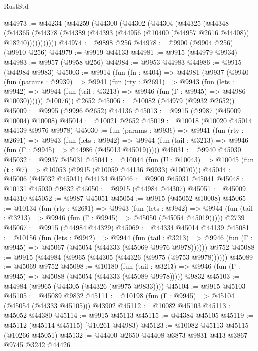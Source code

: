 \begin{lexlean}{RustStd}
\begin{coremodule}
@44973 := @44234
    (@44259
      (@44300
        (@44302
          (@44304
            (@44325
              (@44348
                (@44365
                  (@44378 (@44389 (@44393 (@44956 (@10400 (@44957 @2616 @44408)) @18240)))))))))))
@44974 := @9898 @256
@44978 := @9900 (@9904 @256) (@9910 @256)
@44979 := @9919 @44133
@44981 := @9915 (@44979 @9934)
@44983 := @9957 (@9958 @256)
@44984 := @9953 @44983
@44986 := @9915 (@44984 @9983)
@45003 := @9914
    (fun (fn : @404) =>
    @44981
      (@9937
        (@9940
          (fun (params : @9939) =>
          @9941
            (fun (rty : @2691) =>
            @9943
              (fun (lets : @9942) =>
              @9944 (fun (tail : @3213) => @9946 (fun (Γ : @9945) => @44986 @10030))))))
        @10076))
    @2652
@45006 := @10082 (@44979 (@9932 @2652))
@45009 := @9995 (@9996 @2652) @44136
@45013 := @9915 (@9987 (@45009 @10004) @10008)
@45014 := @10021 @2652
@45019 := @10018 (@10020 @45014 @44139 @9976 @9978)
@45030 := fun (params : @9939) =>
  @9941
    (fun (rty : @2691) =>
    @9943
      (fun (lets : @9942) =>
      @9944 (fun (tail : @3213) => @9946 (fun (Γ : @9945) => @44986 (@45013 @45019)))))
@45031 := @9940 @45030
@45032 := @9937 @45031
@45041 := @10044
    (fun (U : @10043) => @10045 (fun (t : @7) => @10053 (@9915 (@10059 @44136 @9933) @10070)))
@45044 := @45006 (@45032 @45041) @44134
@45046 := @9900 @45031 @45041
@45048 := @10131 @45030 @9632
@45050 := @9915 (@44984 @44307)
@45051 := @45009 @44310
@45052 := @9987 @45051
@45054 := @9915 (@45052 @10008)
@45065 := @10134
    (fun (rty : @2691) =>
    @9943
      (fun (lets : @9942) =>
      @9944 (fun (tail : @3213) => @9946 (fun (Γ : @9945) => @45050 (@45054 @45019)))))
    @2739
@45067 := @9915 (@44984 @44329)
@45069 := @44334 @45014 @44139
@45081 := @10156
    (fun (lets : @9942) =>
    @9944
      (fun (tail : @3213) =>
      @9946 (fun (Γ : @9945) => @45067 (@45054 (@44333 (@45069 @9976 @9978))))))
    @9752
@45088 := @9915 (@44984 (@9965 (@44305 (@44326 (@9975 (@9753 @9978))))))
@45089 := @45069 @9752
@45098 := @10180
    (fun (tail : @3213) => @9946 (fun (Γ : @9945) => @45088 (@45054 (@44333 (@45089 @9978)))))
    @9832
@45103 := @44984 (@9965 (@44305 (@44326 (@9975 @9833))))
@45104 := @9915 @45103
@45105 := @45089 @9832
@45111 := @10198 (fun (Γ : @9945) => @45104 (@45054 (@44333 @45105))) @43902
@45112 := @10082 @45103
@45113 := @45052 @44380
@45114 := @9915 @45113
@45115 := @44384 @45105
@45119 := @45112 (@45114 @45115) (@10261 @44983)
@45123 := @10082 @45113 @45115 (@10266 @45051)
@45132 := @44400 @2650 @44408 @3873 @9831 @413 @3867 @9745 @3242 @44426

\end{coremodule}
\end{lexlean}
